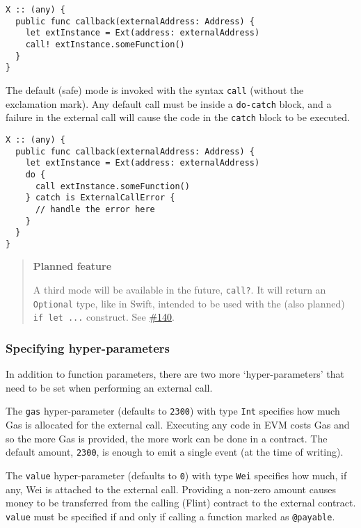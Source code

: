 \begin{verbatim}
X :: (any) {
  public func callback(externalAddress: Address) {
    let extInstance = Ext(address: externalAddress)
    call! extInstance.someFunction()
  }
}
\end{verbatim}

The default (safe) mode is invoked with the syntax \texttt{call} (without the exclamation mark). Any default call must be inside a \texttt{do-catch} block, and a failure in the external call will cause the code in the \texttt{catch} block to be executed.

\begin{verbatim}
X :: (any) {
  public func callback(externalAddress: Address) {
    let extInstance = Ext(address: externalAddress)
    do {
      call extInstance.someFunction()
    } catch is ExternalCallError {
      // handle the error here
    }
  }
}
\end{verbatim}

\begin{quote}
\textbf{Planned feature}

A third mode will be available in the future, \texttt{call?}. It will return an \texttt{Optional} type, like in Swift, intended to be used with the (also planned) \texttt{if let ...} construct. See \href{https://github.com/flintrocks/flint/issues/140}{\#140}.
\end{quote}

\subsubsection{Specifying hyper-parameters}
\label{sec:appendix-b-specifying-hyper-parameters}

In addition to function parameters, there are two more `hyper-parameters' that need to be set when performing an external call.

The \texttt{gas} hyper-parameter (defaults to \texttt{2300}) with type \texttt{Int} specifies how much Gas is allocated for the external call. Executing any code in EVM costs Gas and so the more Gas is provided, the more work can be done in a contract. The default amount, \texttt{2300}, is enough to emit a single event (at the time of writing).

The \texttt{value} hyper-parameter (defaults to \texttt{0}) with type \texttt{Wei} specifies how much, if any, Wei is attached to the external call. Providing a non-zero amount causes money to be transferred from the calling (Flint) contract to the external contract. \texttt{value} must be specified if and only if calling a function marked as \texttt{@payable}.

